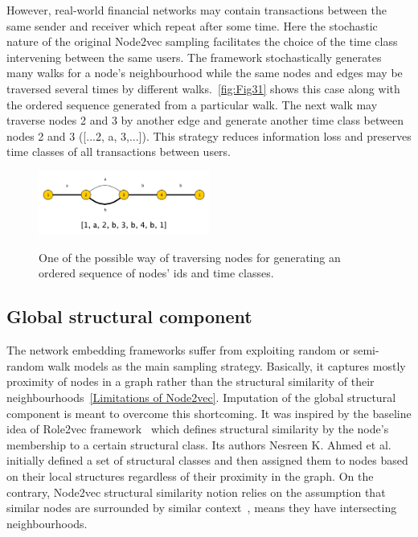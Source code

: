 However, real-world financial networks may contain transactions between the same sender and receiver which repeat after some time. Here the stochastic nature of the original Node2vec sampling facilitates the choice of the time class intervening between the same users. The framework stochastically generates many walks for a node's neighbourhood while the same nodes and edges may be traversed several times by different walks.~\autoref{fig:Fig31} shows this case along with the ordered sequence generated from a particular walk. The next walk may traverse nodes 2 and 3 by another edge and generate another time class between nodes 2 and 3 ([...2, a, 3,...]). This strategy reduces information loss and preserves time classes of all transactions between users.
\begin{figure}[!ht]
	\centering
	\includegraphics[width=0.5\textwidth]{images/Fig31.pdf}\\
	\caption{One of the possible way of traversing nodes for generating an ordered sequence of nodes' ids and time classes.}
	\label{fig:Fig31}
\end{figure}

\subsection{Global structural component}
\label{Global structural component}

The network embedding frameworks suffer from exploiting random or semi-random walk models as the main sampling strategy. Basically, it captures mostly proximity of nodes in a graph rather than the structural similarity of their neighbourhoods~\ref{Limitations of Node2vec}. Imputation of the global structural component is meant to overcome this shortcoming. It was inspired by the baseline idea of Role2vec framework~\cite{role2vec} which defines structural similarity by the node's membership to a certain structural class. Its authors Nesreen K. Ahmed et al. initially defined a set of structural classes and then assigned them to nodes based on their local structures regardless of their proximity in the graph. On the contrary, Node2vec structural similarity notion relies on the assumption that similar nodes are surrounded by similar context~\cite{role2vec}, means they have intersecting neighbourhoods.


